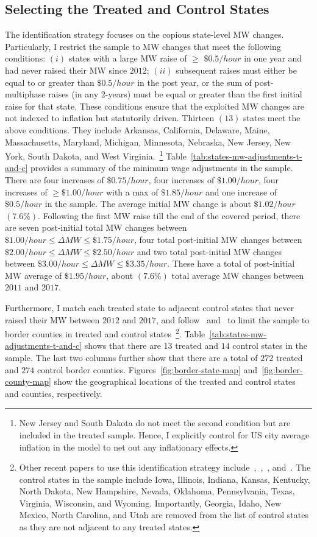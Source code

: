 \documentclass[12pt, english]{article}
\begin{document}
    \subsection{Selecting the Treated and Control States}\label{subsec:selecting-the-treated-and-control-states}
    The identification strategy focuses on the copious state-level MW changes. Particularly, I restrict the sample to MW changes that meet the following conditions: $(i)$ states with a large MW raise of $\geq$ $\$0.5/hour$ in one year and had never raised their MW since $2012$; $(ii)$ subsequent raises must either be equal to or greater than $\$0.5/hour$ in the post year, or the sum of post-multiphase raises (in any $2$-years) must be equal or greater than the first initial raise for that state. These conditions ensure that the exploited MW changes are not indexed to inflation but statutorily driven. Thirteen $(13)$ states meet the above conditions. They include Arkansas, California, Delaware, Maine, Massachusetts, Maryland, Michigan, Minnesota, Nebraska, New Jersey, New York, South Dakota, and West Virginia.~\footnote{\tiny New Jersey and South Dakota do not meet the second condition but are included in the treated sample. Hence, I explicitly control for US city average inflation in the model to net out any inflationary effects.} Table~\ref{tab:states-mw-adjustments-t-and-c} provides a summary of the minimum wage adjustments in the sample. There are four increases of $\$0.75/hour$, four increases of $\$1.00/hour$, four increases of $\geq \$1.00/hour$ with a max of $\$1.85/hour$ and one increase of $\$0.5/hour$ in the sample. The average initial MW change is about $\$1.02/hour$ $(7.6\%)$. Following the first MW raise till the end of the covered period, there are seven post-initial total MW changes between $\$1.00/hour \leq \Delta MW \leq \$1.75/hour$, four total post-initial MW changes between $\$2.00/hour \leq \Delta MW \leq \$2.50/hour$ and two total post-initial MW changes between $\$3.00/hour \leq \Delta MW \leq \$3.35/hour$. These have a total of post-initial MW average of $\$1.95/hour$, about $(7.6\%)$ total average MW changes between $2011$ and $2017$.
    
    Furthermore, I match each treated state to adjacent control states that never raised their MW between $2012$ and $2017$, and follow~\cite{dube2010minimum} and~\cite{gopalan2021state} to limit the sample to border counties in treated and control states~\footnote{\tiny Other recent papers to use this identification strategy include~\cite{aaronson2018industry},~\cite{dube2019fairness},~\cite{jardim2018minimum}, and~\cite{zhang2019distributional}. The control states in the sample include Iowa, Illinois, Indiana, Kansas, Kentucky, North Dakota, New Hampshire, Nevada, Oklahoma, Pennsylvania, Texas, Virginia, Wisconsin, and Wyoming. Importantly, Georgia, Idaho, New Mexico, North Carolina, and Utah are removed from the list of control states as they are not adjacent to any treated states.}. Table~\ref{tab:states-mw-adjustments-t-and-c} shows that there are $13$ treated and $14$ control states in the sample. The last two columns further show that there are a total of $272$ treated and $274$ control border counties. Figures~\ref{fig:border-state-map} and~\ref{fig:border-county-map} show the geographical locations of the treated and control states and counties, respectively.
\end{document}
